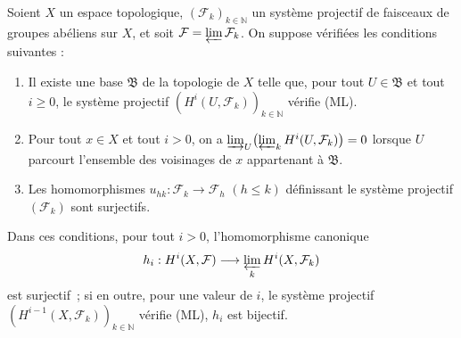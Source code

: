 \begin{proposition}[13.3.1]
\label{0.13.3.1-fr}
Soient $X$ un espace topologique,
$(\mathcal F_k)_{k\in\mathbb N}$ un système projectif de faisceaux de
groupes abéliens sur $X$, et soit
$\mathcal F=\varprojlim\mathcal F_k$. On suppose vérifiées les conditions
suivantes :
\begin{enumerate}
\item[\emph{(i)}]
Il existe une base $\mathfrak B$ de la topologie de $X$ telle que,
pour tout $U\in\mathfrak B$ et tout $i\geq0$, le système projectif
$(H^i(U,\mathcal F_k))_{k\in\mathbb N}$ vérifie \textup{(ML)}.
\item[\emph{(ii)}]
Pour tout $x\in X$ et tout $i>0$, on a
$\varinjlim_U\bigl(\varprojlim_k H^i(U,\mathcal F_k)\bigr)=0$
lorsque $U$ parcourt l'ensemble des voisinages de $x$ appartenant à
$\mathfrak B$.
\item[\emph{(iii)}]
Les homomorphismes
$u_{hk}:\mathcal F_k\to\mathcal F_h$ $(h\leq k)$ définissant le système
projectif $(\mathcal F_k)$ sont surjectifs.
\end{enumerate}

Dans ces conditions, pour tout $i>0$, l'homomorphisme canonique
\[
h_i:H^i(X,\mathcal F)\longrightarrow
\varprojlim_k H^i(X,\mathcal F_k)
\]
est surjectif~; si en outre, pour une valeur de $i$, le système
projectif $(H^{i-1}(X,\mathcal F_k))_{k\in\mathbb N}$ vérifie \textup{(ML)}, $h_i$
est bijectif.
\end{proposition}

